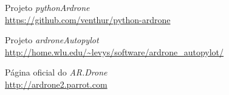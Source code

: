 \documentclass[12pt, a4paper]{article}
\begin{document}
\begin{thebibliography}{99}

	Projeto \emph{pythonArdrone}\\
	\url{https://github.com/venthur/python-ardrone}

	Projeto \emph{ardroneAutopylot}\\
	\url{http://home.wlu.edu/~levys/software/ardrone\_autopylot/}

	Página oficial do \emph{AR.Drone}\\
	\url{http://ardrone2.parrot.com}

\end{thebibliography}
\end{document}
